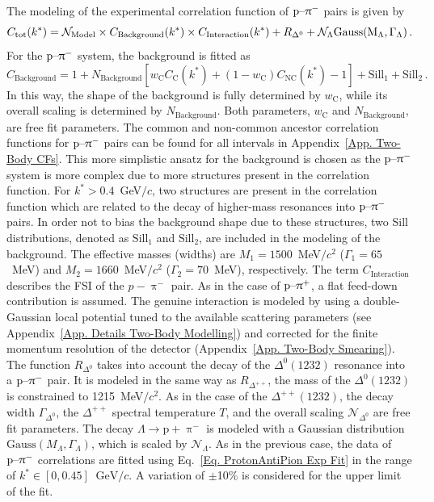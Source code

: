 \documentclass[ALICE,manyauthors]{cernphprep}
\begin{document}
The modeling of the experimental correlation function of $\text{p--}\uppi^-$ pairs is given by
\begin{equation}
C_\text{tot}(k^*) = \mathcal{N}_\text{Model} \times  C_\text{Background}(k^*) \times C_\text{Interaction}(k^*) + R_{\Delta^{0}} +\mathcal{N}_\Lambda \rm{Gauss}(M_\Lambda, \Gamma_\Lambda) \,. \label{Eq. ProtonAntiPion Exp Fit}
\end{equation}
For the $\text{p--}\uppi^-$ system, the background is fitted as
 \begin{equation}
     C_\text{Background} = 1 + N_\text{Background} [ w_\text{C} C_\text{C}(k^*) + (1-w_\text{C}) C_\text{NC}(k^*) -1 ] + \text{Sill}_1 + \text{Sill}_2\,.
 \end{equation}
 In this way, the shape of the background is fully determined by $w_\text{C}$, while its overall scaling is determined by $N_\text{Background}$. Both parameters, $w_\text{C}$ and $N_\text{Background}$, are free fit parameters. The common and non-common ancestor correlation functions for $\text{p--}\uppi^-$ pairs can be found for all \mtText{} intervals in Appendix~\ref{App. Two-Body CFs}. This more simplistic ansatz for the background is chosen as the $\text{p--}\uppi^-$ system is more complex due to more structures present in the correlation function. For $k^* > 0.4$~GeV$/c$, two structures are present in the correlation function which are related to the decay of higher-mass resonances into $\text{p--}\uppi^-$ pairs. In order not to bias the background shape due to these structures, two Sill distributions, denoted as $\text{Sill}_1$ and $\text{Sill}_2$, are included in the modeling of the background. The effective masses (widths) are $M_1=1500$~MeV$/c^2$ ($\Gamma_1 = 65$~MeV) and $M_2=1660$~MeV$/c^2$ ($\Gamma_2 = 70$~MeV), respectively.  The term $C_\text{Interaction}$ describes the FSI of the  $p-\uppi^-$ pair. As in the case of $\text{p--}\uppi^+$, a flat feed-down contribution is assumed. The genuine interaction is modeled by using a double-Gaussian local potential tuned to the available scattering parameters (see Appendix~\ref{App. Details Two-Body Modelling}) and corrected for the finite momentum resolution of the detector (Appendix~\ref{App. Two-Body Smearing}). The function $R_{\Delta^{0}}$ takes into account the decay of the $\Delta^0(1232)$ resonance into a $\text{p--}\uppi^-$ pair. It is modeled in the same way as $R_{\Delta^{++}}$, the mass of the $\Delta^0(1232)$ is constrained to 1215~MeV$/c^2$. As in the case of the $\Delta^{++}(1232)$, the decay width $\Gamma_{\Delta^0}$, the $\Delta^{++}$ spectral temperature $T$, and the overall scaling $\mathcal{N}_{\Delta^{0}}$ are free fit parameters. The decay $\Lambda \rightarrow \text{p} + \uppi^-$ is modeled with a Gaussian distribution $\text{Gauss}(M_\Lambda, \Gamma_\Lambda)$, which is scaled by $\mathcal{N}_\Lambda$. As in the previous case, the data of $\text{p--}\uppi^-$ correlations are fitted using Eq.~\eqref{Eq. ProtonAntiPion Exp Fit} in the range of $k^*\in[0,0.45]~\text{ GeV}/c$. A variation of $\pm$10\% is considered for the upper limit of the fit.
\end{document}
